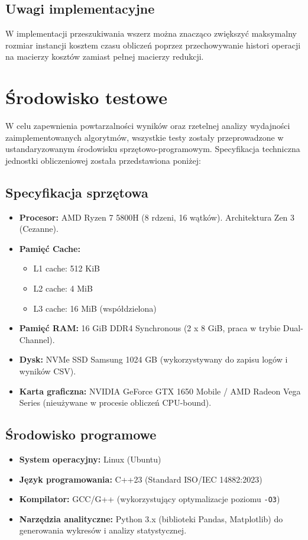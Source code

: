 \documentclass[12pt, a4paper]{article}
\begin{document}
\subsection	{Uwagi implementacyjne}
W implementacji przeszukiwania wszerz można znacząco zwiększyć maksymalny rozmiar instancji kosztem czasu obliczeń poprzez przechowywanie histori operacji na macierzy kosztów zamiast pełnej macierzy redukcji.
\newpage

\section{Środowisko testowe}
W celu zapewnienia powtarzalności wyników oraz rzetelnej analizy wydajności zaimplementowanych algorytmów, wszystkie testy zostały przeprowadzone w ustandaryzowanym środowisku sprzętowo-programowym. Specyfikacja techniczna jednostki obliczeniowej została przedstawiona poniżej:

\subsection{Specyfikacja sprzętowa}
\begin{itemize}
	\item \textbf{Procesor:} AMD Ryzen 7 5800H (8 rdzeni, 16 wątków). Architektura Zen 3 (Cezanne).
	\item \textbf{Pamięć Cache:}
	\begin{itemize}
		\item L1 cache: 512 KiB
		\item L2 cache: 4 MiB
		\item L3 cache: 16 MiB (współdzielona)
	\end{itemize}
	\item \textbf{Pamięć RAM:} 16 GiB DDR4 Synchronous (2 x 8 GiB, praca w trybie Dual-Channel).
	\item \textbf{Dysk:} NVMe SSD Samsung 1024 GB (wykorzystywany do zapisu logów i wyników CSV).
	\item \textbf{Karta graficzna:} NVIDIA GeForce GTX 1650 Mobile / AMD Radeon Vega Series (nieużywane w procesie obliczeń CPU-bound).
\end{itemize}

\subsection{Środowisko programowe}
\begin{itemize}
	\item \textbf{System operacyjny:} Linux (Ubuntu) 
	\item \textbf{Język programowania:} C++23 (Standard ISO/IEC 14882:2023)
	\item \textbf{Kompilator:} GCC/G++ (wykorzystujący optymalizacje poziomu \texttt{-O3})
	\item \textbf{Narzędzia analityczne:} Python 3.x (biblioteki Pandas, Matplotlib) do generowania wykresów i analizy statystycznej.
\end{itemize}	
	
	
	
\end{document}
